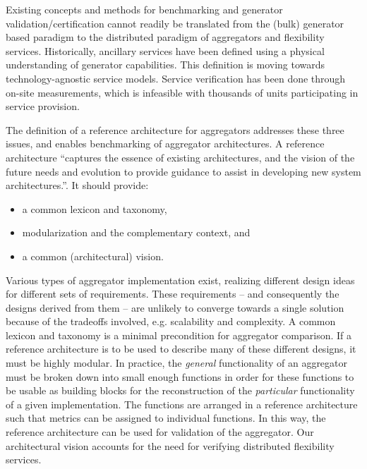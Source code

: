 Existing concepts and methods for benchmarking and generator validation/certification cannot readily be translated from the (bulk) generator based paradigm to the distributed paradigm of aggregators and flexibility services. Historically, ancillary services have been defined using a physical understanding of generator capabilities. This definition is moving towards technology-agnostic service models.
Service verification has been done through on-site measurements, which is infeasible with thousands of units participating in service provision.  

The definition of a reference architecture for aggregators addresses these three issues, and enables benchmarking of aggregator architectures.
A reference architecture ``captures the essence of existing architectures, and the vision of the future needs and evolution to provide guidance to assist in developing new system architectures.''\cite{cloutier2010concept}. It should provide: 
\begin{itemize}
\item a common lexicon and taxonomy,
\item modularization and the complementary context, and
\item a common (architectural) vision.
\end{itemize} 

%
%
Various types of aggregator implementation exist, realizing different design ideas for different sets of requirements. These requirements -- and consequently the designs derived from them -- are unlikely to converge towards a single solution because of the tradeoffs involved, e.g. scalability and complexity. A common lexicon and taxonomy is a minimal precondition for aggregator comparison.
If a reference architecture is to be used to describe many of these different designs, it must be highly modular. In practice, the \emph{general} functionality of an aggregator must be broken down into small enough functions in order for these functions to be usable as building blocks for the reconstruction of the \emph{particular} functionality of a given implementation. 
The functions are arranged in a reference architecture such that metrics can be assigned to individual functions. In this way, the reference architecture can be used for validation of the aggregator. Our architectural vision accounts for the need for verifying distributed flexibility services.

